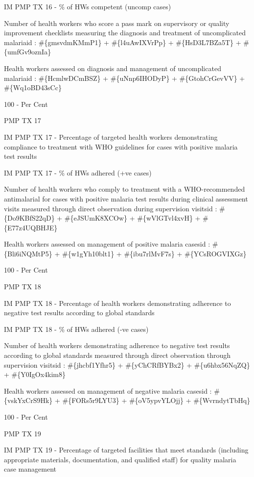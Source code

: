 \documentclass[]{book}
\begin{document}
IM PMP TX 16 - \% of HWs competent (uncomp cases)

Number of health workers who score a pass mark on supervisory or quality improvement checklists measuring the diagnosis and treatment of uncomplicated malariaid : \#\{gmsvdmKMmP1\} + \#\{l4uAwIXVrPp\} + \#\{HsD3L7BZa5T\} + \#\{umfGv9oznIa\}

Health workers assessed on diagnosis and management of uncomplicated malariaid : \#\{HcmlwDCmBSZ\} + \#\{uNnp6IHODyP\} + \#\{GtohCrGevVV\} + \#\{Wq1oBD43sCc\}

100 - Per Cent

PMP TX 17

IM PMP TX 17 - Percentage of targeted health workers demonstrating compliance to treatment with WHO guidelines for cases with positive malaria test results

IM PMP TX 17 - \% of HWs adhered (+ve cases)

Number of health workers who comply to treatment with a WHO-recommended antimalarial for cases with positive malaria test results during clinical assessment visits measured through direct observation during supervision visitsid : \#\{Do9KBfS22qD\} + \#\{eJSUmK8XCOw\} + \#\{wVlGTvl4xvH\} + \#\{E77z4UQBHJE\}

Health workers assessed on management of positive malaria casesid : \#\{Bli6iNQMtP5\} + \#\{w1gYh10blt1\} + \#\{ibu7rlMvF7s\} + \#\{YCsROGVIXGz\}

100 - Per Cent

PMP TX 18

IM PMP TX 18 - Percentage of health workers demonstrating adherence to negative test results according to global standards

IM PMP TX 18 - \% of HWs adhered (-ve cases)

Number of health workers demonstrating adherence to negative test results according to global standards measured through direct observation through supervision visitsid : \#\{jhcbf1Yfhr5\} + \#\{yChCRfBYBx2\} + \#\{u6hbx56NqZQ\} + \#\{Y0IgOx4kim8\}

Health workers assessed on management of negative malaria casesid : \#\{vskYxCrS9Hk\} + \#\{FORs5r9LYU3\} + \#\{oV5ypvYLOjj\} + \#\{WvrndytTbHq\}

100 - Per Cent

PMP TX 19

IM PMP TX 19 - Percentage of targeted facilities that meet standards (including appropriate materials, documentation, and qualified staff) for quality malaria case management
\end{document}
